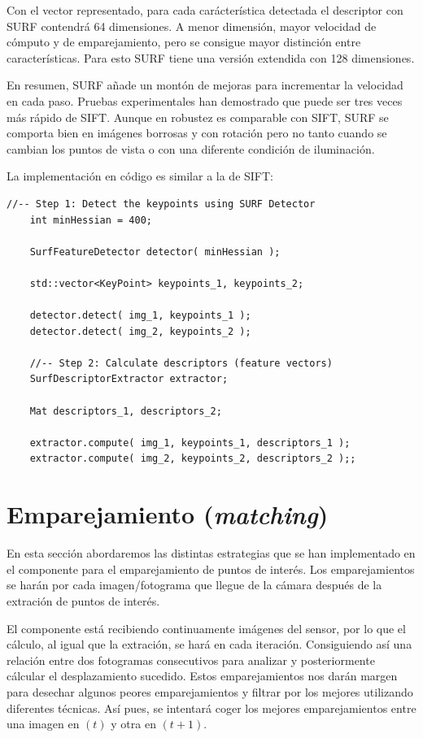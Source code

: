 Con el vector representado, para cada carácterística detectada el descriptor con SURF contendrá 64 dimensiones. A menor dimensión, mayor velocidad de cómputo y de emparejamiento, pero se consigue mayor distinción entre características. Para esto SURF tiene una versión extendida con 128 dimensiones.

En resumen, SURF añade un montón de mejoras para incrementar la velocidad en cada paso. Pruebas experimentales han demostrado que puede ser tres veces más rápido de SIFT. Aunque en robustez es comparable con SIFT, SURF se comporta bien en imágenes borrosas y con rotación pero no tanto cuando se cambian los puntos de vista o con una diferente condición de iluminación.

La implementación en código es similar a la de SIFT:

\begin{lstlisting}[style=CStyle]
	//-- Step 1: Detect the keypoints using SURF Detector
	int minHessian = 400;

	SurfFeatureDetector detector( minHessian );

	std::vector<KeyPoint> keypoints_1, keypoints_2;

	detector.detect( img_1, keypoints_1 );
	detector.detect( img_2, keypoints_2 );

	//-- Step 2: Calculate descriptors (feature vectors)
	SurfDescriptorExtractor extractor;

	Mat descriptors_1, descriptors_2;

	extractor.compute( img_1, keypoints_1, descriptors_1 );
	extractor.compute( img_2, keypoints_2, descriptors_2 );;
\end{lstlisting}



\section{Emparejamiento (\textit{matching})}

En esta sección abordaremos las distintas estrategias que se han implementado en el componente para el emparejamiento de puntos de interés. Los emparejamientos se harán por cada imagen/fotograma que llegue de la cámara después de la extración de puntos de interés.

El componente está recibiendo continuamente imágenes del sensor, por lo que el cálculo, al igual que la extración, se hará en cada iteración. Consiguiendo así una relación entre dos fotogramas consecutivos para analizar y posteriormente cálcular el desplazamiento sucedido. Estos emparejamientos nos darán margen para desechar algunos peores emparejamientos y filtrar por los mejores utilizando diferentes técnicas. Así pues, se intentará coger los mejores emparejamientos entre una imagen en $(t)$ y otra en $(t+1)$.

